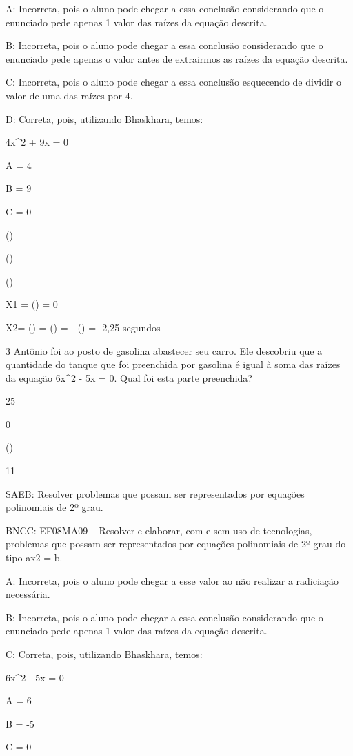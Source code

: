 {A: Incorreta, pois o aluno pode chegar a essa conclusão considerando que
o enunciado pede apenas 1 valor das raízes da equação descrita.

B: Incorreta, pois o aluno pode chegar a essa conclusão considerando que
o enunciado pede apenas o valor antes de extrairmos as raízes da equação
descrita.

C: Incorreta, pois o aluno pode chegar a essa conclusão esquecendo de
dividir o valor de uma das raízes por 4.

D: Correta, pois, utilizando Bhaskhara, temos:

4x^2 + 9x = 0

A = 4

B = 9

C = 0

()

()

()

X1 = () = 0

X2= () = () = - () =
-2,25 segundos

\num{3} Antônio foi ao posto de gasolina abastecer seu carro. Ele descobriu
que a quantidade do tanque que foi preenchida por gasolina é igual à
soma das raízes da equação 6x^2 - 5x = 0. Qual foi esta parte preenchida?
\item 25
\item 0
\item ()
\item 11

SAEB: Resolver problemas que possam ser representados por equações
polinomiais de 2º grau.

BNCC: EF08MA09 -- Resolver e elaborar, com e sem uso de tecnologias,
problemas que possam ser representados por equações polinomiais de 2º
grau do tipo ax2 = b.

A: Incorreta, pois o aluno pode chegar a esse valor ao não realizar a
radiciação necessária.

B: Incorreta, pois o aluno pode chegar a essa conclusão considerando que
o enunciado pede apenas 1 valor das raízes da equação descrita.

C: Correta, pois, utilizando Bhaskhara, temos:

6x^2 - 5x = 0

A = 6

B = -5

C = 0

}
